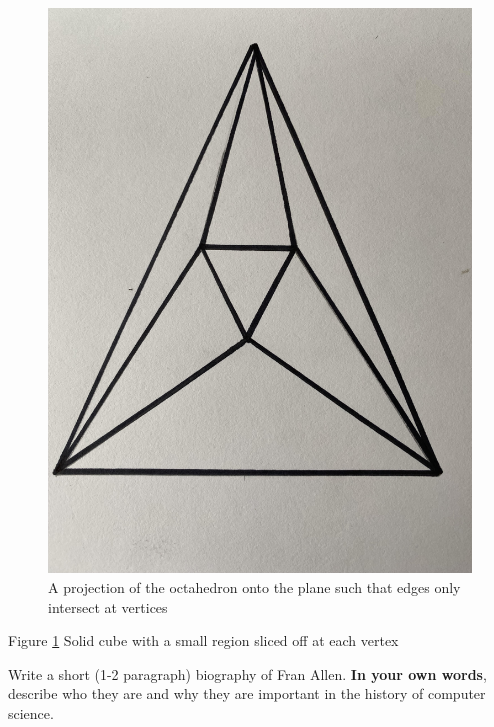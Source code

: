 \documentclass{article}
\begin{document}
\begin{enumerate}
        \begin{figure}
          \includegraphics[width=\linewidth]{plane-octahedron.png}
          \caption{A projection of the octahedron onto the plane such that edges only
              intersect at vertices}
          \label{fig:plane-octahedron}
        \end{figure}
Figure \ref{fig:plane-octahedron} Solid cube with a small region sliced off at each vertex


\end{enumerate}


Write a short (1-2 paragraph) biography of Fran Allen.
\textbf{In your own words}, describe who they are and why they are important in
the history of computer science.
\end{document}
